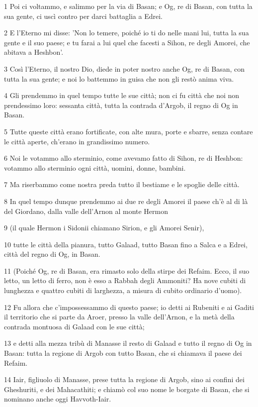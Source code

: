 \par 1 Poi ci voltammo, e salimmo per la via di Basan; e Og, re di Basan, con tutta la sua gente, ci uscì contro per darci battaglia a Edrei.
\par 2 E l'Eterno mi disse: 'Non lo temere, poiché io ti do nelle mani lui, tutta la sua gente e il suo paese; e tu farai a lui quel che facesti a Sihon, re degli Amorei, che abitava a Heshbon'.
\par 3 Così l'Eterno, il nostro Dio, diede in poter nostro anche Og, re di Basan, con tutta la sua gente; e noi lo battemmo in guisa che non gli restò anima viva.
\par 4 Gli prendemmo in quel tempo tutte le sue città; non ci fu città che noi non prendessimo loro: sessanta città, tutta la contrada d'Argob, il regno di Og in Basan.
\par 5 Tutte queste città erano fortificate, con alte mura, porte e sbarre, senza contare le città aperte, ch'erano in grandissimo numero.
\par 6 Noi le votammo allo sterminio, come avevamo fatto di Sihon, re di Heshbon: votammo allo sterminio ogni città, uomini, donne, bambini.
\par 7 Ma riserbammo come nostra preda tutto il bestiame e le spoglie delle città.
\par 8 In quel tempo dunque prendemmo ai due re degli Amorei il paese ch'è al di là del Giordano, dalla valle dell'Arnon al monte Hermon
\par 9 (il quale Hermon i Sidonii chiamano Sirion, e gli Amorei Senir),
\par 10 tutte le città della pianura, tutto Galaad, tutto Basan fino a Salca e a Edrei, città del regno di Og, in Basan.
\par 11 (Poiché Og, re di Basan, era rimasto solo della stirpe dei Refaim. Ecco, il suo letto, un letto di ferro, non è esso a Rabbah degli Ammoniti? Ha nove cubiti di lunghezza e quattro cubiti di larghezza, a misura di cubito ordinario d'uomo).
\par 12 Fu allora che c'impossessammo di questo paese; io detti ai Rubeniti e ai Gaditi il territorio che si parte da Aroer, presso la valle dell'Arnon, e la metà della contrada montuosa di Galaad con le sue città;
\par 13 e detti alla mezza tribù di Manasse il resto di Galaad e tutto il regno di Og in Basan: tutta la regione di Argob con tutto Basan, che si chiamava il paese dei Refaim.
\par 14 Iair, figliuolo di Manasse, prese tutta la regione di Argob, sino ai confini dei Gheshuriti, e dei Mahacathiti; e chiamò col suo nome le borgate di Basan, che si nominano anche oggi Havvoth-Iair.
